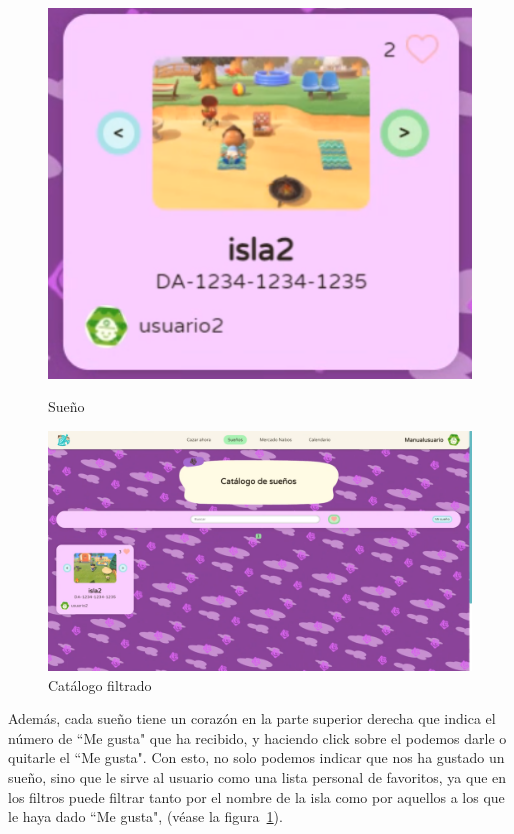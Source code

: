 \begin{figure}[!htb]
	\begin{minipage}{0.48\textwidth}
		\centering
		\includegraphics[width=.7\linewidth]{img/cap9/55-sueno.png}
		\caption{Sueño}
		\label{fig:sueno}
	\end{minipage}\hfill
	\begin{minipage}{0.48\textwidth}
		\centering
		\includegraphics[width=\linewidth]{img/cap9/56-catalogo-sueno-filtro-like.png}
		\caption{Catálogo filtrado}
		\label{fig:catfiltered}
	\end{minipage}
\end{figure}

Además, cada sueño tiene un corazón en la parte superior derecha que indica el número de ``Me gusta" que ha recibido, y haciendo click sobre el podemos darle o quitarle el ``Me gusta". Con esto, no solo podemos indicar que nos ha gustado un sueño, sino que le sirve al usuario como una lista personal de favoritos, ya que en los filtros puede filtrar tanto por el nombre de la isla como por aquellos a los que le haya dado ``Me gusta", {(v\'ease la figura~\ref{fig:catfiltered})}.\\

